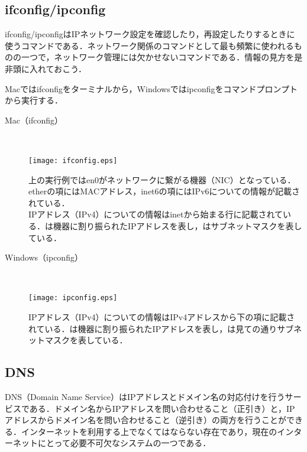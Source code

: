 \subsection{ifconfig/ipconfig}
ifconfig/ipconfigはIPネットワーク設定を確認したり，再設定したりするときに使うコマンドである．ネットワーク関係のコマンドとして最も頻繁に使われるものの一つで，ネットワーク管理には欠かせないコマンドである．情報の見方を是非頭に入れておこう．

Macではifconfigをターミナルから，Windowsではipconfigをコマンドプロンプトから実行する．

\begin{screen}
\begin{description}
 \item[Mac（ifconfig）]\mbox{}\\ 
  \begin{center}
    \texttt{[image: ifconfig.eps]}　
  \end{center}
  上の実行例ではen0がネットワークに繋がる機器（NIC）となっている．etherの項にはMACアドレス，inet6の項にはIPv6についての情報が記載されている．\\
  IPアドレス（IPv4）についての情報はinetから始まる行に記載されている．は機器に割り振られたIPアドレスを表し，はサブネットマスクを表している．\\
 \item[Windows（ipconfig）]\mbox{}\\
     \begin{center}
    \texttt{[image: ipconfig.eps]}　
  \end{center}
  IPアドレス（IPv4）についての情報はIPv4アドレスから下の項に記載されている．は機器に割り振られたIPアドレスを表し，は見ての通りサブネットマスクを表している．
\end{description}
\end{screen}

\subsection{DNS}
DNS（Domain Name Service）はIPアドレスとドメイン名の対応付けを行うサービスである．ドメイン名からIPアドレスを問い合わせること（正引き）と，IPアドレスからドメイン名を問い合わせること（逆引き）の両方を行うことができる．インターネットを利用する上でなくてはならない存在であり，現在のインターネットにとって必要不可欠なシステムの一つである．

